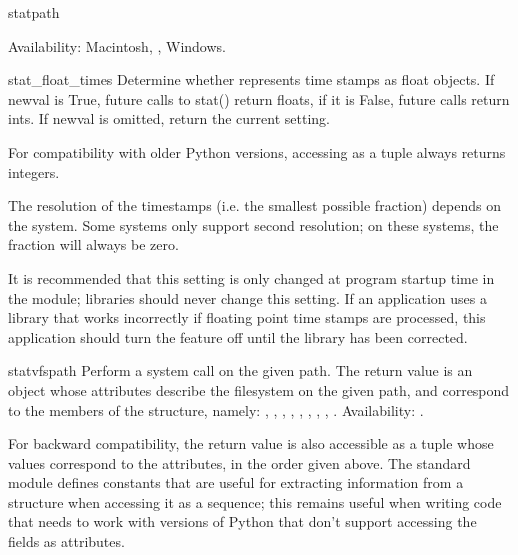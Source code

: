 \begin{funcdesc}{stat}{path}

Availability: Macintosh, \UNIX, Windows.

\end{funcdesc}

\begin{funcdesc}{stat_float_times}{}
Determine whether  represents time stamps as float
objects.  If newval is True, future calls to stat() return floats, if
it is False, future calls return ints.  If newval is omitted, return
the current setting.

For compatibility with older Python versions, accessing
 as a tuple always returns integers.


The resolution of the timestamps (i.e. the smallest possible fraction)
depends on the system. Some systems only support second resolution;
on these systems, the fraction will always be zero.

It is recommended that this setting is only changed at program startup
time in the  module; libraries should never change this
setting. If an application uses a library that works incorrectly if
floating point time stamps are processed, this application should turn
the feature off until the library has been corrected.

\end{funcdesc}

\begin{funcdesc}{statvfs}{path}
Perform a  system call on the given path.  The
return value is an object whose attributes describe the filesystem on
the given path, and correspond to the members of the
 structure, namely:
,
,
,
,
,
,
,
,
.
Availability: \UNIX.

For backward compatibility, the return value is also accessible as a
tuple whose values correspond to the attributes, in the order given above.
The standard module 
defines constants that are useful for extracting information
from a  structure when accessing it as a sequence; this
remains useful when writing code that needs to work with versions of
Python that don't support accessing the fields as attributes.

\end{funcdesc}

